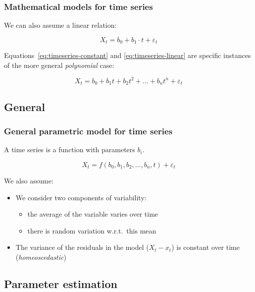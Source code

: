 \documentclass{beamer}
\begin{document}
\begin{frame}
  \frametitle{Mathematical models for time series}

  We can also assume a linear relation:
  
  \begin{equation}
    X_{t} = b_{0} + b_{1} \cdot t + \varepsilon_{t}
    \label{eq:timeseries-linear}
  \end{equation}

  Equations~\ref{eq:timeseries-constant} and \ref{eq:timeseries-linear} are specific instances of the more general \emph{polynomial} case:

  \begin{equation}
    X_{t} = b_{0} + b_{1} t + b_{2} t^{2} + \dots + b_{n} t^{n} + \varepsilon_{t}
    \label{eq:timeseries-polynomial}
  \end{equation}
\end{frame}

\subsection{General}

\begin{frame}
  \frametitle{General parametric model for time series}

  A time series is a function with parameters $b_i$.

  \begin{equation}
    X_{t} = f(b_{0}, b_{1}, b_{2}, \dots , b_{n}, t) + \varepsilon_{t}
    \label{eq:timeseries-parametric}
  \end{equation}

  We also assume:

  \begin{itemize}
    \item We consider two components of variability:
      \begin{itemize}
        \item the average of the variable varies over time
        \item there is random variation w.r.t.~this mean
      \end{itemize}
    \item The variance of the residuals in the model ($X_t - x_t$) is constant over time (\emph{homeoscedastic})
  \end{itemize}
\end{frame}

\subsection{Parameter estimation}
\end{document}
